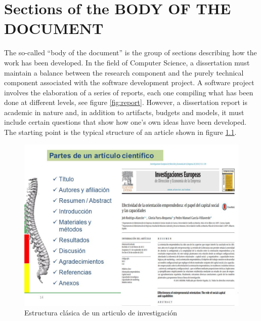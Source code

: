 
 \chapter{Sections of the BODY OF THE DOCUMENT}

The so-called ``body of the document'' is the group of sections describing how the work has been developed. In the field of Computer Science, a dissertation must maintain a balance between the research component and the purely technical component associated with the software development project. A software project involves the elaboration of a series of reports, each one compiling what has been done at different levels, see figure \ref{fig:report}. However, a dissertation report is academic in nature and, in addition to artifacts, budgets and models, it must include certain questions that show how one's own ideas have been developed. The starting point is the typical structure of an article shown in figure \ref{fig:articulo}.


\begin{figure}

	\begin{center}
		\includegraphics[scale = 0.45]{Figures/articulo.jpg}
	\end{center}
	\caption{Estructura clásica de un articulo de investigación}
	\label{fig:articulo}
\end{figure}


